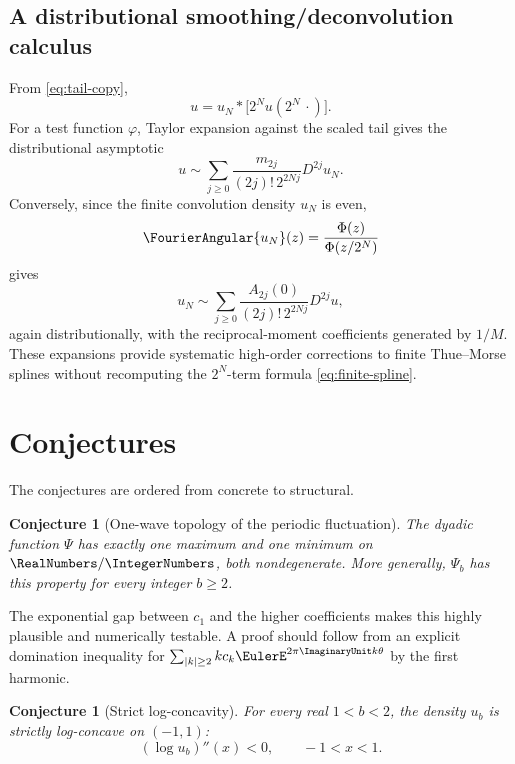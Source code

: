 \documentclass[11pt,oneside]{article}
\newtheorem{conjecture}[theorem]{Conjecture}
\theoremstyle{definition}
\theoremstyle{remark}
\begin{document}
\subsection{A distributional smoothing/deconvolution calculus}

From \eqref{eq:tail-copy},
\begin{equation}
 u=u_N*\bigl[2^Nu(2^N\,\cdot)\bigr].
 \label{eq:smoothing}
\end{equation}
For a test function \(\varphi\), Taylor expansion against the scaled tail
gives the distributional asymptotic
\begin{equation}
 u
 \sim
 \sum_{j\geq0}
 \frac{m_{2j}}{(2j)!\,2^{2Nj}}D^{2j}u_N.
 \label{eq:smoothing-expansion}
\end{equation}
Conversely, since the finite convolution density $u_N$ is even,
\[
 \FourierAngular{u_N}(z)=\frac{\Phi(z)}{\Phi(z/2^N)}
\]
gives
\begin{equation}
 u_N
 \sim
 \sum_{j\geq0}
 \frac{A_{2j}(0)}{(2j)!\,2^{2Nj}}D^{2j}u,
 \label{eq:deconvolution-expansion}
\end{equation}
again distributionally, with the reciprocal-moment coefficients generated
by \(1/M\).  These expansions provide systematic high-order corrections to
finite Thue--Morse splines without recomputing the \(2^N\)-term formula
\eqref{eq:finite-spline}.

\section{Conjectures}

The conjectures are ordered from concrete to structural.

\begin{conjecture}[One-wave topology of the periodic fluctuation]
\label{conj:one-wave}
The dyadic function \(\Psi\) has exactly one maximum and one minimum on
\(\RealNumbers/\IntegerNumbers\), both nondegenerate.  More generally, \(\Psi_b\) has this property
for every integer \(b\geq2\).
\end{conjecture}

The exponential gap between \(c_1\) and the higher coefficients makes this
highly plausible and numerically testable.  A proof should follow from an
explicit domination inequality for \(\sum_{|k|\geq2}k c_k\EulerE^{2\pi\ImaginaryUnit
k\theta}\) by the first harmonic.

\begin{conjecture}[Strict log-concavity]
\label{conj:strict-logconcavity}
For every real \(1<b<2\), the density \(u_b\) is strictly log-concave on
\((-1,1)\):
\[
 (\log u_b)''(x)<0,\qquad -1<x<1.
\]
\end{conjecture}
\end{document}
